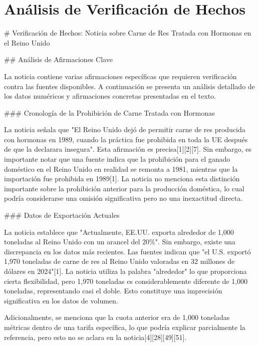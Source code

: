 \documentclass[10pt,a4paper]{article}
\begin{document}
\section*{Análisis de Verificación de Hechos}
    \# Verificaci\'{o}n de Hechos: Noticia sobre Carne de Res Tratada con Hormonas en el Reino Unido
\par\medskip
\#\# An\'{a}lisis de Afirmaciones Clave
\par\medskip
La noticia contiene varias afirmaciones espec\'{i}ficas que requieren verificaci\'{o}n contra las fuentes disponibles. A continuaci\'{o}n se presenta un an\'{a}lisis detallado de los datos num\'{e}ricos y afirmaciones concretas presentadas en el texto.
\par\medskip
\#\#\# Cronolog\'{i}a de la Prohibici\'{o}n de Carne Tratada con Hormonas
\par\medskip
La noticia se\~{n}ala que "El Reino Unido dej\'{o} de permitir carne de res producida con hormonas en 1989, cuando la pr\'{a}ctica fue prohibida en toda la UE despu\'{e}s de que la declarara insegura". Esta afirmaci\'{o}n es precisa[1][2][7]. Sin embargo, es importante notar que una fuente indica que la prohibici\'{o}n para el ganado dom\'{e}stico en el Reino Unido en realidad se remonta a 1981, mientras que la importaci\'{o}n fue prohibida en 1989[1]. La noticia no menciona esta distinci\'{o}n importante sobre la prohibici\'{o}n anterior para la producci\'{o}n dom\'{e}stica, lo cual podr\'{i}a considerarse una omisi\'{o}n significativa pero no una inexactitud directa.
\par\medskip
\#\#\# Datos de Exportaci\'{o}n Actuales
\par\medskip
La noticia establece que "Actualmente, EE.UU. exporta alrededor de 1,000 toneladas al Reino Unido con un arancel del 20\%". Sin embargo, existe una discrepancia en los datos m\'{a}s recientes. Las fuentes indican que "el U.S. export\'{o} 1,970 toneladas de carne de res al Reino Unido valoradas en 32 millones de d\'{o}lares en 2024"[1]. La noticia utiliza la palabra "alrededor" lo que proporciona cierta flexibilidad, pero 1,970 toneladas es considerablemente diferente de 1,000 toneladas, representando casi el doble. Esto constituye una imprecisi\'{o}n significativa en los datos de volumen.
\par\medskip
Adicionalmente, se menciona que la cuota anterior era de 1,000 toneladas m\'{e}tricas dentro de una tarifa espec\'{i}fica, lo que podr\'{i}a explicar parcialmente la referencia, pero esto no se aclara en la noticia[4][28][49][51].
\end{document}
